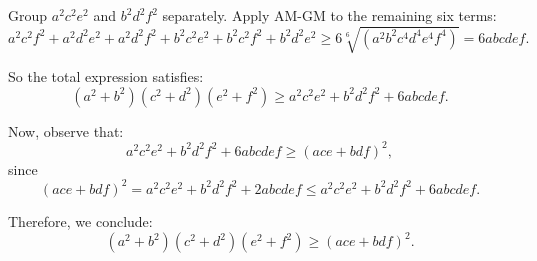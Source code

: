\documentclass{article}
\begin{document}
Group $a^2c^2e^2$ and $b^2d^2f^2$ separately. Apply AM-GM to the remaining six terms:
\[
a^2c^2f^2 + a^2d^2e^2 + a^2d^2f^2 + b^2c^2e^2 + b^2c^2f^2 + b^2d^2e^2 \ge 6\sqrt[6]{(a^2b^2c^4d^4e^4f^4)} = 6abcdef.
\]

So the total expression satisfies:
\[
(a^2 + b^2)(c^2 + d^2)(e^2 + f^2) \ge a^2c^2e^2 + b^2d^2f^2 + 6abcdef.
\]

Now, observe that:
\[
a^2c^2e^2 + b^2d^2f^2 + 6abcdef \ge (ace + bdf)^2,
\]
since
\[
(ace + bdf)^2 = a^2c^2e^2 + b^2d^2f^2 + 2abcdef \le a^2c^2e^2 + b^2d^2f^2 + 6abcdef.
\]

Therefore, we conclude:
\[
(a^2 + b^2)(c^2 + d^2)(e^2 + f^2) \ge (ace + bdf)^2.
\]
\end{document}

